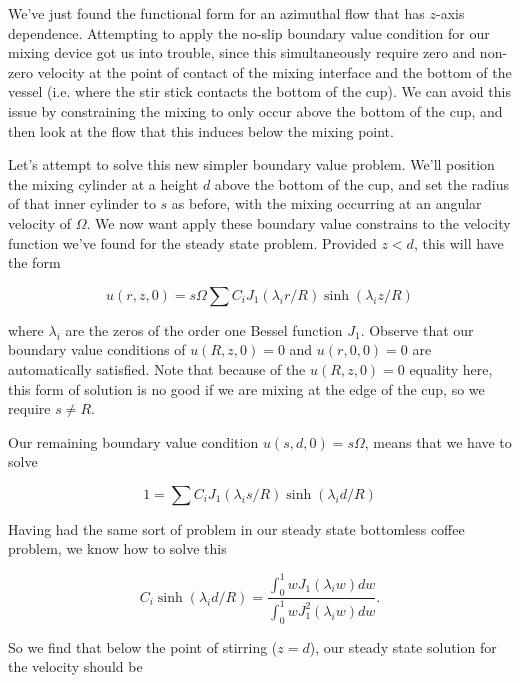 We've just found the functional form for an azimuthal flow that has $z$-axis dependence.  Attempting to apply the no-slip boundary value condition for our mixing device got us into trouble, since this simultaneously require zero and non-zero velocity at the point of contact of the mixing interface and the bottom of the vessel (i.e. where the stir stick contacts the bottom of the cup).  We can avoid this issue by constraining the mixing to only occur above the bottom of the cup, and then look at the flow that this induces below the mixing point.

Let's attempt to solve this new simpler boundary value problem.  We'll position the mixing cylinder at a height $d$ above the bottom of the cup, and set the radius of that inner cylinder to $s$ as before, with the mixing occurring at an angular velocity of $\Omega$.  We now want apply these boundary value constrains to the velocity function we've found for the steady state problem.  Provided $z < d$, this will have the form

\begin{equation}\label{eqn:coffeeCupWithBottom:500}
u(r, z, 0) = s \Omega \sum C_i J_1(\lambda_i r/R) \sinh(\lambda_i z/R)
\end{equation}

where $\lambda_i$ are the zeros of the order one Bessel function $J_1$.  Observe that our boundary value conditions of $u(R, z, 0) = 0$ and $u(r, 0, 0) = 0$ are automatically satisfied.  Note that because of the $u(R, z, 0) = 0$ equality here, this form of solution is no good if we are mixing at the edge of the cup, so we require $s \ne R$.

Our remaining boundary value condition $u(s, d, 0) = s \Omega$, means that we have to solve

\begin{equation}\label{eqn:coffeeCupWithBottom:520}
1 = \sum C_i J_1(\lambda_i s/R) \sinh(\lambda_i d/R)
\end{equation}

Having had the same sort of problem in our steady state bottomless coffee problem, we know how to solve this

\begin{equation}\label{eqn:coffeeCupWithBottom:540}
C_i \sinh(\lambda_i d/R) = 
\frac{
\int_0^1 w J_1 (\lambda_i w) dw
}{
\int_0^1 w J_1^2 (\lambda_i w) dw
}.
\end{equation}

So we find that below the point of stirring ($z = d$), our steady state solution for the velocity should be

